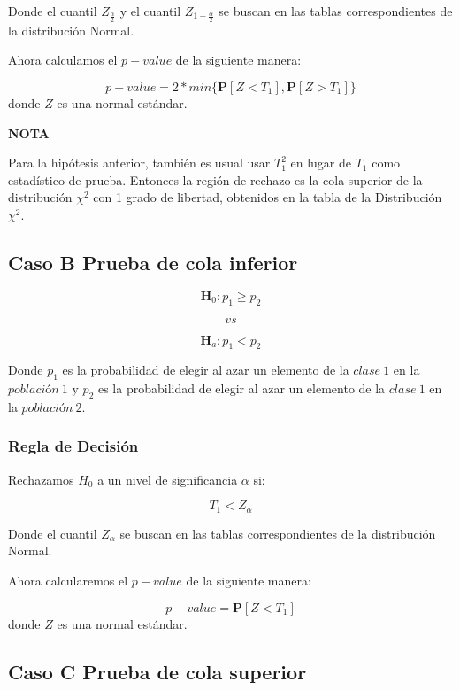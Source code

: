\documentclass[
  a4paper,
  oneside,
  openany]{book}
\begin{document}
Donde el cuantil \(Z_\frac{\alpha}{2}\) y el cuantil \(Z_{1-\frac{\alpha}{2}}\) se buscan en las tablas correspondientes de la distribución Normal.

Ahora calculamos el \(p-value\) de la siguiente manera:

\[p-value=2*min\{ \mathbf{P}[Z<T_{1}],\mathbf{P}[Z>T_{1}]\}\]
donde \(Z\) es una normal estándar.

\textbf{NOTA}

Para la hipótesis anterior, también es usual usar \(T_{1}^2\) en lugar de \(T_{1}\) como estadístico de prueba. Entonces la región de rechazo es la cola superior de la distribución \(\chi^2\) con 1 grado de libertad, obtenidos en la tabla de la Distribución \(\chi^2\).

\hypertarget{caso-b-prueba-de-cola-inferior-6}{%
\subsection*{Caso B Prueba de cola inferior}\label{caso-b-prueba-de-cola-inferior-6}}


\[\textbf{H}_0: p_{1} \geq p_{2}\]

\[vs\]

\[\textbf{H}_a: p_{1} < p_{2}\]

Donde \(p_{1}\) es la probabilidad de elegir al azar un elemento de la \(clase\ 1\) en la \(población\ 1\) y \(p_{2}\) es la probabilidad de elegir al azar un elemento de la \(clase\ 1\) en la \(población\ 2\).

\hypertarget{regla-de-decisiuxf3n-22}{%
\subsubsection*{Regla de Decisión}\label{regla-de-decisiuxf3n-22}}


Rechazamos \(H_0\) a un nivel de significancia \(\alpha\) si:

\[T_{1}< Z_{\alpha}\]

Donde el cuantil \(Z_{\alpha}\) se buscan en las tablas correspondientes de la distribución Normal.

Ahora calcularemos el \(p-value\) de la siguiente manera:

\[p-value=\mathbf{P}[Z<T_{1}]\]
donde \(Z\) es una normal estándar.

\hypertarget{caso-c-prueba-de-cola-superior-5}{%
\subsection*{Caso C Prueba de cola superior}\label{caso-c-prueba-de-cola-superior-5}}
\end{document}
